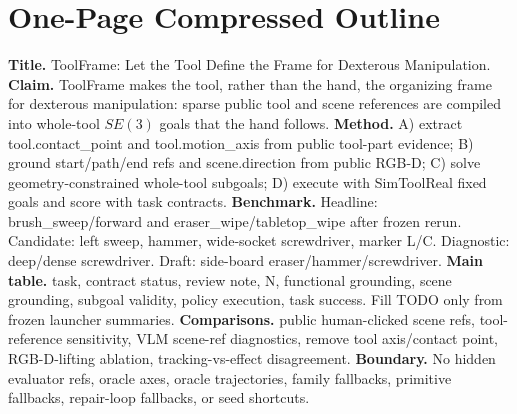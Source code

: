\documentclass[journal]{IEEEtran}
\begin{document}
\section{One-Page Compressed Outline}
\textbf{Title.} ToolFrame: Let the Tool Define the Frame for Dexterous
Manipulation.
\textbf{Claim.} ToolFrame makes the tool, rather than the hand, the organizing
frame for dexterous manipulation: sparse public tool and scene references are
compiled into whole-tool $SE(3)$ goals that the hand follows.
\textbf{Method.} A) extract tool.contact\_point and tool.motion\_axis from
public tool-part evidence; B) ground start/path/end refs and scene.direction
from public RGB-D; C) solve geometry-constrained whole-tool subgoals; D) execute
with SimToolReal fixed goals and score with task contracts.
\textbf{Benchmark.} Headline: brush\_sweep/forward and
eraser\_wipe/tabletop\_wipe after frozen rerun. Candidate: left sweep, hammer,
wide-socket screwdriver, marker L/C. Diagnostic: deep/dense screwdriver. Draft:
side-board eraser/hammer/screwdriver.
\textbf{Main table.} task, contract status, review note, N, functional
grounding, scene grounding, subgoal validity, policy execution, task success.
Fill TODO only from frozen launcher summaries.
\textbf{Comparisons.} public human-clicked scene refs, tool-reference
sensitivity, VLM scene-ref diagnostics, remove tool axis/contact point,
RGB-D-lifting ablation, tracking-vs-effect disagreement.
\textbf{Boundary.} No hidden evaluator refs, oracle axes, oracle trajectories,
family fallbacks, primitive fallbacks, repair-loop fallbacks, or seed shortcuts.
\end{document}
